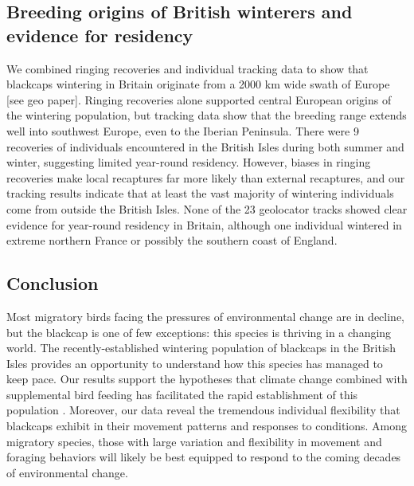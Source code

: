 \documentclass[a4paper, twoside]{templates/ociamthesis}
\begin{document}
\hypertarget{breeding-origins-of-british-winterers-and-evidence-for-residency}{%
\subsection{Breeding origins of British winterers and evidence for residency}\label{breeding-origins-of-british-winterers-and-evidence-for-residency}}

We combined ringing recoveries and individual tracking data to show that blackcaps wintering in Britain originate from a 2000 km wide swath of Europe {[}see geo paper{]}. Ringing recoveries alone supported central European origins of the wintering population, but tracking data show that the breeding range extends well into southwest Europe, even to the Iberian Peninsula. There were 9 recoveries of individuals encountered in the British Isles during both summer and winter, suggesting limited year-round residency. However, biases in ringing recoveries make local recaptures far more likely than external recaptures, and our tracking results indicate that at least the vast majority of wintering individuals come from outside the British Isles. None of the 23 geolocator tracks showed clear evidence for year-round residency in Britain, although one individual wintered in extreme northern France or possibly the southern coast of England.

\hypertarget{conclusion-1}{%
\subsection{Conclusion}\label{conclusion-1}}

Most migratory birds facing the pressures of environmental change are in decline, but the blackcap is one of few exceptions: this species is thriving in a changing world. The recently-established wintering population of blackcaps in the British Isles provides an opportunity to understand how this species has managed to keep pace. Our results support the hypotheses that climate change combined with supplemental bird feeding has facilitated the rapid establishment of this population \autocite{plummerSupplementaryFeedingGardens2015}. Moreover, our data reveal the tremendous individual flexibility that blackcaps exhibit in their movement patterns and responses to conditions. Among migratory species, those with large variation and flexibility in movement and foraging behaviors will likely be best equipped to respond to the coming decades of environmental change.
\end{document}
